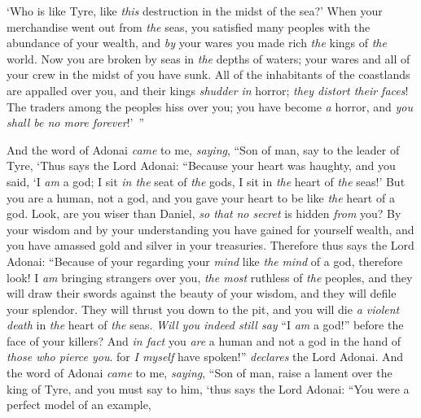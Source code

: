 \begin{biblechapter}
‘Who is like Tyre, 
like \textit{this} destruction in the midst of the sea?’
\verse When your merchandise went out from \textit{the} seas, 
you satisfied many peoples with the abundance of your wealth, 
and \textit{by} your wares 
you made rich \textit{the} kings of \textit{the} world.
\verse Now you are broken by seas 
in \textit{the} depths of waters; 
your wares and all of your crew 
in the midst of you have sunk.
\verse All of the inhabitants of the coastlands 
are appalled over you, 
and their kings \textit{shudder} \textit{in} horror; 
\textit{they distort their faces}!
\verse The traders among the peoples hiss over you; 
you have become \textit{a} horror, 
and \textit{you shall be no more forever}!’ ”
\end{biblechapter}

\begin{biblechapter} %
 And the word of Adonai \textit{came} to me, \textit{saying},
\verse “Son of man, say to the leader of Tyre, ‘Thus says the Lord Adonai:
\verse “Because your heart was haughty, 
and you said, ‘I \textit{am} a god; 
I sit \textit{in the} seat of \textit{the} gods, 
I sit in \textit{the} heart of \textit{the} seas!’ 
But you are a human, not a god, 
and you gave your heart to be like \textit{the} heart of a god.
\verse Look, are you wiser than Daniel, 
\textit{so that} \textit{no secret} is hidden \textit{from} you?
\verse By your wisdom and by your understanding 
you have gained for yourself wealth, 
and you have amassed gold and silver 
in your treasuries.
\verse Therefore thus says the Lord Adonai:
\verse “Because of your regarding your \textit{mind} 
like \textit{the} \textit{mind} of a god,
\verse therefore look! I \textit{am} bringing strangers over you, 
\textit{the most} ruthless of \textit{the} peoples, 
and they will draw their swords against the beauty of your wisdom, 
and they will defile your splendor.
\verse They will thrust you down to the pit, 
and you will die \textit{a violent death} 
in \textit{the} heart of \textit{the} seas.
\verse \textit{Will you indeed still say} “I \textit{am} a god!” 
before the face of your killers? 
And \textit{in fact} you \textit{are} a human and not a god 
in the hand of \textit{those who pierce you}. for \textit{I myself} have spoken!” \textit{declares} the Lord Adonai.
\verse And the word of Adonai \textit{came} to me, \textit{saying},
\verse “Son of man, raise a lament over the king of Tyre, and you must say to him, ‘thus says the Lord Adonai:
\verse “You were a perfect model of an example, 

\end{biblechapter}

